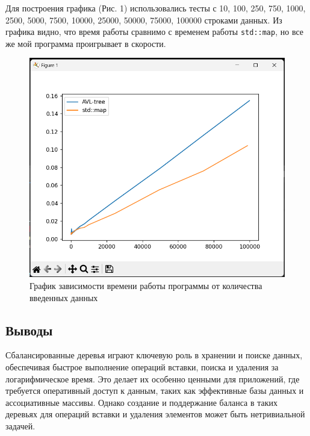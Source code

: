 \documentclass[12pt]{article}
\begin{document}
Для построения графика (Рис. 1) использовались тесты с 10, 100, 250, 750, 1000, 2500, 5000, 7500, 10000, 25000, 50000, 75000, 100000 строками данных.
Из графика видно, что время работы сравнимо с временем работы \texttt{std::map}, но все же мой программа проигрывает в скорости.

\begin{figure}
    \centering
    \includegraphics[width=\textwidth]{graph.png}
    \caption{График зависимости времени работы программы от количества введенных данных}
\end{figure}

\newpage
\subsection*{Выводы}

Сбалансированные деревья играют ключевую роль в хранении и поиске данных, обеспечивая быстрое выполнение операций вставки, поиска и удаления за логарифмическое время.
Это делает их особенно ценными для приложений, где требуется оперативный доступ к данным, таких как эффективные базы данных и ассоциативные массивы.
Однако создание и поддержание баланса в таких деревьях для операций вставки и удаления элементов может быть нетривиальной задачей.
\end{document}
